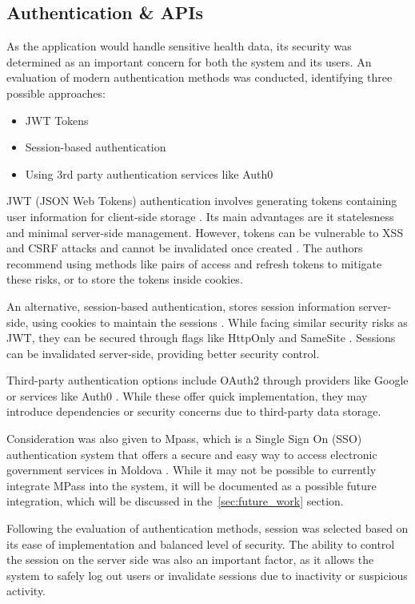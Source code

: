\subsection{Authentication \& APIs}

As the application would handle sensitive health data, its security was determined as an important concern for both the system and its users. An evaluation of modern authentication methods was conducted, identifying three possible approaches:

\begin{itemize}
    \item JWT Tokens
    \item Session-based authentication
    \item Using 3rd party authentication services like Auth0
\end{itemize}

JWT (JSON Web Tokens) authentication involves generating tokens containing user information for client-side storage \parencite{auth1}. Its main advantages are it statelesness and minimal server-side management. However, tokens can be vulnerable to XSS and CSRF attacks and cannot be invalidated once created \parencite{auth1, auth2}. The authors recommend using methods like pairs of access and refresh tokens to mitigate these risks, or to store the tokens inside cookies.

An alternative, session-based authentication, stores session information server-side, using cookies to maintain the sessions \parencite{auth1, auth2}. While facing similar security risks as JWT, they can be secured through flags like HttpOnly and SameSite \parencite{mozilla}. Sessions can be invalidated server-side, providing better security control.

Third-party authentication options include OAuth2 through providers like Google \parencite{auth2, auth3} or services like Auth0 \parencite{auth0}. While these offer quick implementation, they may introduce dependencies or security concerns due to third-party data storage. 

Consideration was also given to Mpass, which is a Single Sign On (SSO) authentication system that offers a secure and easy way to access electronic government services in Moldova \parencite{mpass}. While it may not be possible to currently integrate MPass into the system, it will be documented as a possible future integration, which will be discussed in the~\ref{sec:future_work} section.

Following the evaluation of authentication methods, session was selected based on its ease of implementation and balanced level of security. The ability to control the session on the server side was also an important factor, as it allows the system to safely log out users or invalidate sessions due to inactivity or suspicious activity.


